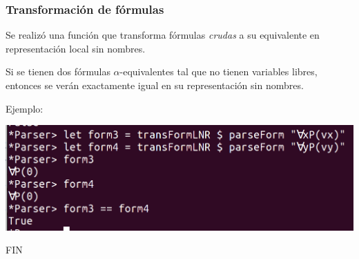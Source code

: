 \documentclass{beamer}
\begin{document}
\begin{frame}
\frametitle{Transformación de fórmulas}

Se realizó una función que transforma fórmulas \textit{crudas} a su equivalente en representación local sin nombres.

Si se tienen dos fórmulas $\alpha$-equivalentes tal que no tienen variables libres, entonces se verán exactamente igual en su representación sin nombres.

Ejemplo:

\includegraphics[scale=0.25]{nameless.png}

\end{frame}

\begin{frame}

\centering
{\Huge FIN}

\end{frame}
\end{document}
